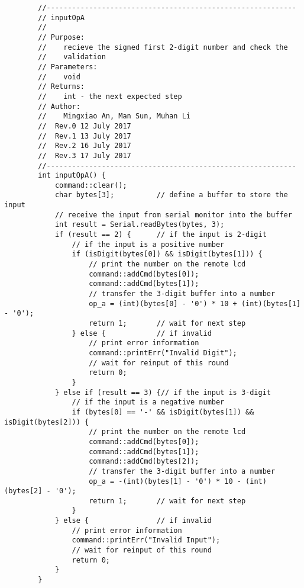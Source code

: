 \begin{verbatim}
        //-----------------------------------------------------------  
        // inputOpA 
        //  
        // Purpose:  
        //    recieve the signed first 2-digit number and check the 
        //    validation
        // Parameters:  
        //    void 
        // Returns:  
        //    int - the next expected step   
        // Author:  
        //    Mingxiao An, Man Sun, Muhan Li
        //  Rev.0 12 July 2017
        //  Rev.1 13 July 2017
        //  Rev.2 16 July 2017
        //  Rev.3 17 July 2017
        //-----------------------------------------------------------
        int inputOpA() {
            command::clear();
            char bytes[3];          // define a buffer to store the input
            // receive the input from serial monitor into the buffer
            int result = Serial.readBytes(bytes, 3);
            if (result == 2) {      // if the input is 2-digit
                // if the input is a positive number
                if (isDigit(bytes[0]) && isDigit(bytes[1])) {
                    // print the number on the remote lcd
                    command::addCmd(bytes[0]);
                    command::addCmd(bytes[1]);
                    // transfer the 3-digit buffer into a number
                    op_a = (int)(bytes[0] - '0') * 10 + (int)(bytes[1] - '0');
                    return 1;       // wait for next step
                } else {            // if invalid
                    // print error information
                    command::printErr("Invalid Digit");
                    // wait for reinput of this round
                    return 0;
                }
            } else if (result == 3) {// if the input is 3-digit
                // if the input is a negative number
                if (bytes[0] == '-' && isDigit(bytes[1]) && isDigit(bytes[2])) {
                    // print the number on the remote lcd
                    command::addCmd(bytes[0]);
                    command::addCmd(bytes[1]);
                    command::addCmd(bytes[2]);
                    // transfer the 3-digit buffer into a number
                    op_a = -(int)(bytes[1] - '0') * 10 - (int)(bytes[2] - '0');
                    return 1;       // wait for next step
                }
            } else {                // if invalid
                // print error information
                command::printErr("Invalid Input");
                // wait for reinput of this round
                return 0;
            }
        }


\end{verbatim}
